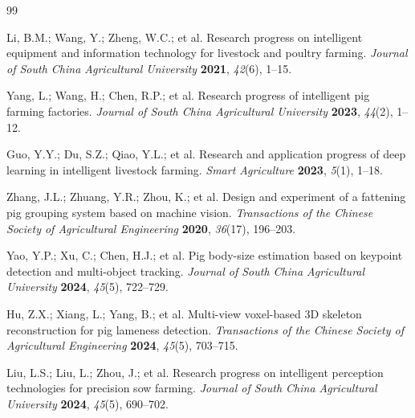 \documentclass[computers,article,submit,pdftex,moreauthors]{Definitions/mdpi}
\begin{document}







\begin{thebibliography}{99}

 Li, B.M.; Wang, Y.; Zheng, W.C.; et al. Research progress on intelligent equipment and information technology for livestock and poultry farming. \textit{Journal of South China Agricultural University} \textbf{2021}, \textit{42}(6), 1--15.

 Yang, L.; Wang, H.; Chen, R.P.; et al. Research progress of intelligent pig farming factories. \textit{Journal of South China Agricultural University} \textbf{2023}, \textit{44}(2), 1--12.

 Guo, Y.Y.; Du, S.Z.; Qiao, Y.L.; et al. Research and application progress of deep learning in intelligent livestock farming. \textit{Smart Agriculture} \textbf{2023}, \textit{5}(1), 1--18.

 Zhang, J.L.; Zhuang, Y.R.; Zhou, K.; et al. Design and experiment of a fattening pig grouping system based on machine vision. \textit{Transactions of the Chinese Society of Agricultural Engineering} \textbf{2020}, \textit{36}(17), 196--203.

 Yao, Y.P.; Xu, C.; Chen, H.J.; et al. Pig body-size estimation based on keypoint detection and multi-object tracking. \textit{Journal of South China Agricultural University} \textbf{2024}, \textit{45}(5), 722--729.

 Hu, Z.X.; Xiang, L.; Yang, B.; et al. Multi-view voxel-based 3D skeleton reconstruction for pig lameness detection. \textit{Transactions of the Chinese Society of Agricultural Engineering} \textbf{2024}, \textit{45}(5), 703--715.

 Liu, L.S.; Liu, L.; Zhou, J.; et al. Research progress on intelligent perception technologies for precision sow farming. \textit{Journal of South China Agricultural University} \textbf{2024}, \textit{45}(5), 690--702.


\end{thebibliography}
\end{document}
